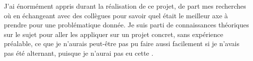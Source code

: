 J'ai énormément appris durant la réalisation de ce projet, de part mes recherches où en échangeant avec des collègues pour savoir quel était le meilleur axe à prendre pour une problématique donnée. Je suis parti de connaissances théoriques sur le sujet pour aller les appliquer sur un projet concret, sans expérience préalable, ce que je n'aurais peut-être pas pu faire aussi facilement si je n'avais pas été alternant, puisque je n'aurai pas eu cette .
